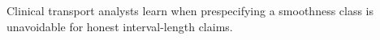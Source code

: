 Clinical transport analysts learn when prespecifying a smoothness class is unavoidable for honest interval-length claims.
